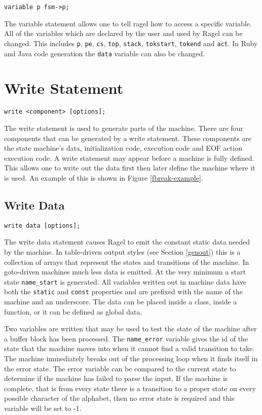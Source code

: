 \documentclass[letterpaper,11pt,oneside]{book}
\newcommand{\verbspace}{\vspace{10pt}}
\begin{document}
\begin{verbatim}
variable p fsm->p;
\end{verbatim}
\verbspace

The variable statement allows one to tell ragel how to access a specific
variable. All of the variables which are declared by the user and
used by Ragel can be changed. This includes \verb|p|, \verb|pe|, \verb|cs|,
\verb|top|, \verb|stack|, \verb|tokstart|, \verb|tokend| and \verb|act|.
In Ruby and Java code generation the \verb|data| variable can also be changed.

\section{Write Statement}
\label{write-statement}

\begin{verbatim}
write <component> [options];
\end{verbatim}
\verbspace


The write statement is used to generate parts of the machine. 
There are four
components that can be generated by a write statement. These components are the
state machine's data, initialization code, execution code and EOF action
execution code. A write statement may appear before a machine is fully defined.
This allows one to write out the data first then later define the machine where
it is used. An example of this is shown in Figure \ref{fbreak-example}.

\subsection{Write Data}
\begin{verbatim}
write data [options];
\end{verbatim}
\verbspace

The write data statement causes Ragel to emit the constant static data needed
by the machine. In table-driven output styles (see Section \ref{genout}) this
is a collection of arrays that represent the states and transitions of the
machine.  In goto-driven machines much less data is emitted. At the very
minimum a start state \verb|name_start| is generated.  All variables written
out in machine data have both the \verb|static| and \verb|const| properties and
are prefixed with the name of the machine and an
underscore. The data can be placed inside a class, inside a function, or it can
be defined as global data.

Two variables are written that may be used to test the state of the machine
after a buffer block has been processed. The \verb|name_error| variable gives
the id of the state that the machine moves into when it cannot find a valid
transition to take. The machine immediately breaks out of the processing loop when
it finds itself in the error state. The error variable can be compared to the
current state to determine if the machine has failed to parse the input. If the
machine is complete, that is from every state there is a transition to a proper
state on every possible character of the alphabet, then no error state is required
and this variable will be set to -1.
\end{document}
